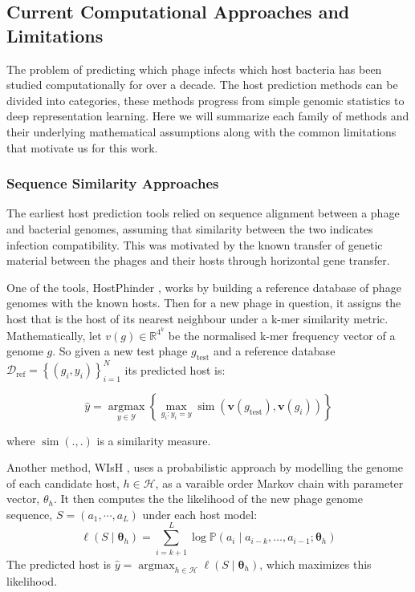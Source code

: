 \subsection{Current Computational Approaches and Limitations}
\label{sec2.2: current approaches}
\noindent The problem of predicting which phage infects which host bacteria has been studied computationally for over a decade. The host 
prediction methods can be divided into categories, these methods progress from simple genomic statistics to deep 
representation learning. Here we will summarize each family of methods and their underlying mathematical assumptions along with
the common limitations that motivate us for this work.


\subsubsection{Sequence Similarity Approaches}
\label{sec2.2.1: SSA}
\noindent The earliest host prediction tools relied on sequence alignment between a phage and bacterial genomes, assuming that similarity 
between the two indicates infection compatibility. This was motivated by the known transfer of genetic material between the 
phages and their hosts through horizontal gene transfer.

\vspace{0.15cm}
\noindent One of the tools, HostPhinder \cite{villarroel2016hostphinder}, works by building a reference database of phage genomes with the
known hosts. Then for a new phage in question, it assigns the host that is the host of its nearest neighbour under a k-mer similarity
metric. Mathematically, let $v(g) \in \mathbb{R}^{4^k}$ be the normalised k-mer frequency vector of a genome $g$. So given a new
test phage $g_{\text{test}}$ and a reference database $\mathcal{D}_{\text{ref}} = \left\{(g_i, y_i)\right\}_{i = 1}^N$ its 
predicted host is:

$$\hat{y} = \operatorname*{argmax}_{y \in \mathcal{Y}} \left\{ \max_{g_i : y_i = y} \operatorname{sim}\left(\mathbf{v}(g_{\text{test}}), 
\mathbf{v}(g_i)\right) \right\}$$

\noindent where $\operatorname*{sim}(., .)$ is a similarity measure.

\vspace{0.15cm}
\noindent Another method, WIsH \cite{galiez2017wish}, uses a probabilistic approach by modelling the genome of each candidate
host, $h \in \mathcal{H}$, as a varaible order Markov chain with parameter vector, $\theta_h$. It then computes the the likelihood 
of the new phage genome sequence, $S = (a_1, \cdots, a_L)$ under each host model:
$$\ell(S \mid \boldsymbol{\theta}_h) = \sum_{i=k+1}^L \log \mathbb{P}\left(a_i \mid a_{i-k}, \dots, a_{i-1}; 
\boldsymbol{\theta}_h\right)$$
The predicted host is $\hat{y} = \operatorname*{argmax}_{h \in \mathcal{H}} \ell(S \mid \boldsymbol{\theta}_h)$, 
which maximizes this likelihood.

